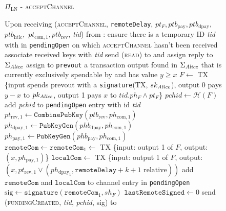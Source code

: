   \begin{figure}[H]
    \begin{protocolbox}{$\Pi_{\mathrm{LN}}$ - \textsc{acceptChannel}}
      \begin{algorithmic}[1]
        \State Upon receiving (\textsc{acceptChannel}, \texttt{remoteDelay},
        $pt_F, ptb_{\mathrm{pay}}, ptb_{\mathrm{dpay}},$ $ptb_{\mathrm{htlc}},$
        $pt_{\mathrm{com}, 1}, ptb_{\mathrm{rev}}$, \textit{tid}) from \bob:
        \Indent
          \State ensure there is a temporary ID \textit{tid} with \bob{} in
          \texttt{pendingOpen} on which \textsc{acceptChannel} hasn't been
          received
          \State associate received keys with \textit{tid}
          \State send (\textsc{read}) to \ledger{} and assign reply to
          $\Sigma_{\mathit{Alice}}$
          \State assign to \texttt{prevout} a transaction output found in
          $\Sigma_{\mathit{Alice}}$ that is currently exclusively spendable by \alice{}
          and has value $y \geq x$
          \State $F \gets$ TX \{input spends prevout with a
          \texttt{signature}(TX, $sk_{\mathit{Alice}}$), output 0 pays $y - x$ to
          $pk_{\mathit{Alice}}$, output 1 pays $x$ to $\textit{tid}.ph_F \wedge pt_F$\}
          \State $\mathit{pchid} \gets \mathcal{H}\left(F\right)$
          \State add \textit{pchid} to \texttt{pendingOpen} entry with id
          \textit{tid}
          \State $pt_{\mathrm{rev}, 1} \gets
          \mathtt{CombinePubKey}\left(ptb_{\mathrm{rev}}, ph_{\mathrm{com},
          1}\right)$
          \State $ph_{\mathrm{dpay}, 1} \gets
          \texttt{PubKeyGen}\left(phb_{\mathrm{dpay}}, ph_{\mathrm{com},
          1}\right)$
          \State $ph_{\mathrm{pay}, 1} \gets
          \texttt{PubKeyGen}\left(phb_{\mathrm{pay}}, ph_{\mathrm{com},
          1}\right)$
          \State $\mathtt{remoteCom} \gets \mathtt{remoteCom}_1 \gets$ TX
          \{input: output 1 of $F$, output: $\left(x, ph_{\mathrm{pay},
          1}\right)$\}
          \State $\mathtt{localCom} \gets$ TX \{input: output 1 of $F$, output:
          $\left(x, pt_{\mathrm{rev}, 1} \vee \left(ph_{\mathrm{dpay}_1},
          \mathtt{remoteDelay} + k + 1 \text{ relative}\right)\right)$
          \State add $\mathtt{remoteCom}$ and $\mathtt{localCom}$ to channel
          entry in \texttt{pendingOpen}
          \State $\mathrm{sig} \gets
          \mathtt{signature}\left(\mathtt{remoteCom}_1, sh_F\right)$
          \State $\mathtt{lastRemoteSigned} \gets 0$
          \State send (\textsc{fundingCreated}, \textit{tid},
          \textit{pchid}, sig) to \bob{}
        \EndIndent
      \end{algorithmic}
    \end{protocolbox}
    \caption{}
    \label{alg:protocol:open:acceptChannel}
  \end{figure}

